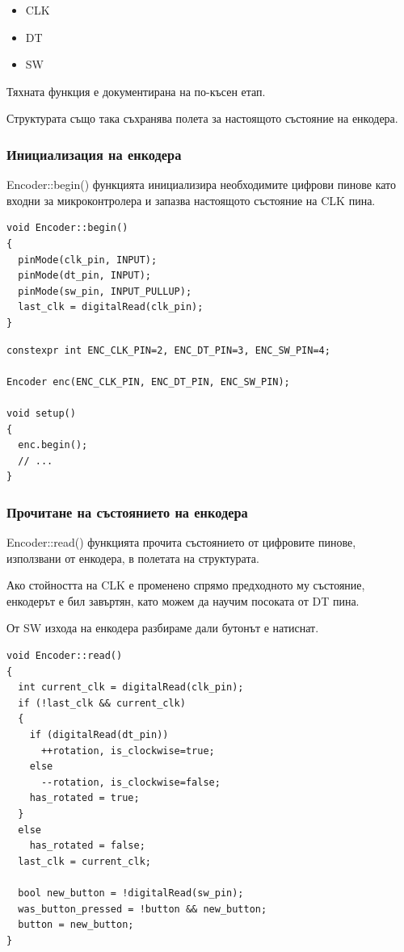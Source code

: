 \documentclass[titlepage, oneside, 14pt]{extbook}
\renewcommand{\texttt}[1]{{\small\ttfamily #1}}
\begin{document}
\begin{itemize}
    \item CLK
    \item DT
    \item SW
\end{itemize}

Тяхната функция е документирана на по-късен етап. %

Структурата също така съхранява полета за настоящото състояние на енкодера.


\subsubsection{Инициализация на енкодера}

\texttt{Encoder::begin()} функцията инициализира необходимите цифрови пинове като
входни за микроконтролера и запазва настоящото състояние на CLK пина.

\begin{verbatim}
void Encoder::begin()
{
  pinMode(clk_pin, INPUT);
  pinMode(dt_pin, INPUT);
  pinMode(sw_pin, INPUT_PULLUP);
  last_clk = digitalRead(clk_pin); 
}
\end{verbatim}

\begin{verbatim}
constexpr int ENC_CLK_PIN=2, ENC_DT_PIN=3, ENC_SW_PIN=4;

Encoder enc(ENC_CLK_PIN, ENC_DT_PIN, ENC_SW_PIN);

void setup()
{
  enc.begin();
  // ...
}
\end{verbatim}

\subsubsection{Прочитане на състоянието на енкодера}

\texttt{Encoder::read()} функцията прочита състоянието от цифровите пинове, използвани от енкодера, в полетата на структурата.

Ако стойността на CLK е променено спрямо предходното му състояние, енкодерът е бил завъртян, като можем да научим
посоката от DT пина.

От SW изхода на енкодера разбираме дали бутонът е натиснат.

\begin{verbatim}
void Encoder::read()
{
  int current_clk = digitalRead(clk_pin);
  if (!last_clk && current_clk)
  {
    if (digitalRead(dt_pin))
      ++rotation, is_clockwise=true;
    else
      --rotation, is_clockwise=false;
    has_rotated = true;
  }
  else
    has_rotated = false;
  last_clk = current_clk;

  bool new_button = !digitalRead(sw_pin);
  was_button_pressed = !button && new_button;
  button = new_button;
}
\end{verbatim}
\end{document}
